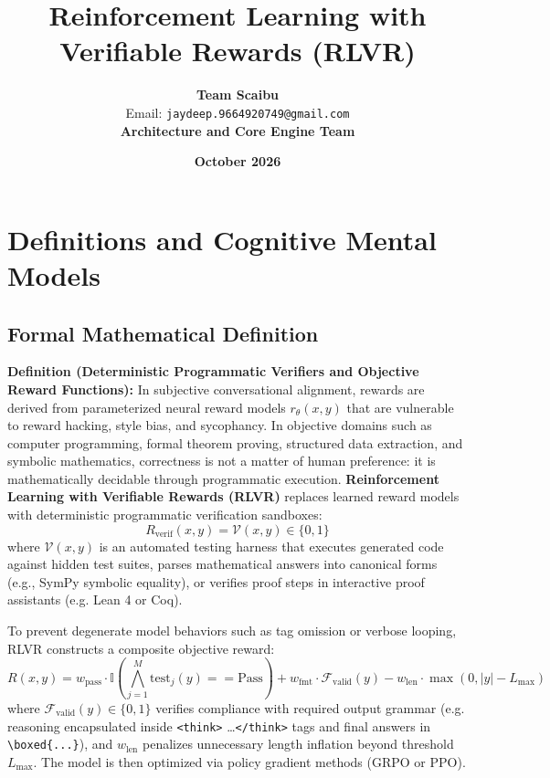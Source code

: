 \documentclass[11pt,a4paper]{article}
\title{\textbf{Reinforcement Learning with Verifiable Rewards (RLVR)}}
\author{\textbf{Team Scaibu} \\ \small Email: \texttt{jaydeep.9664920749@gmail.com} \\ \small \textbf{Architecture and Core Engine Team}}
\date{\textbf{October 2026}}
\theoremstyle{definition}
\begin{document}
\maketitle

\section{Definitions and Cognitive Mental Models}

\subsection{Formal Mathematical Definition}
\textbf{Definition (Deterministic Programmatic Verifiers and Objective Reward Functions):}
In subjective conversational alignment, rewards are derived from parameterized neural reward models $r_\theta(x, y)$ that are vulnerable to reward hacking, style bias, and sycophancy. In objective domains such as computer programming, formal theorem proving, structured data extraction, and symbolic mathematics, correctness is not a matter of human preference: it is mathematically decidable through programmatic execution. \textbf{Reinforcement Learning with Verifiable Rewards (RLVR)} replaces learned reward models with deterministic programmatic verification sandboxes:
{\boldmath
\begin{equation}
R_{\text{verif}}(x, y) = \mathcal{V}(x, y) \in \{0, 1\}
\end{equation}
}
where $\mathcal{V}(x, y)$ is an automated testing harness that executes generated code against hidden test suites, parses mathematical answers into canonical forms (e.g., SymPy symbolic equality), or verifies proof steps in interactive proof assistants (e.g. Lean 4 or Coq).

To prevent degenerate model behaviors such as tag omission or verbose looping, RLVR constructs a composite objective reward:
{\boldmath
\begin{equation}
R(x, y) = w_{\text{pass}} \cdot \mathbb{I}\left( \bigwedge_{j=1}^M \text{test}_j(y) == \text{Pass} \right) + w_{\text{fmt}} \cdot \mathcal{F}_{\text{valid}}(y) - w_{\text{len}} \cdot \max(0, |y| - L_{\max})
\end{equation}
}
where $\mathcal{F}_{\text{valid}}(y) \in \{0, 1\}$ verifies compliance with required output grammar (e.g. reasoning encapsulated inside \texttt{<think>} \dots \texttt{</think>} tags and final answers in \texttt{\textbackslash boxed\{...\}}), and $w_{\text{len}}$ penalizes unnecessary length inflation beyond threshold $L_{\max}$. The model is then optimized via policy gradient methods (GRPO or PPO).
\end{document}
